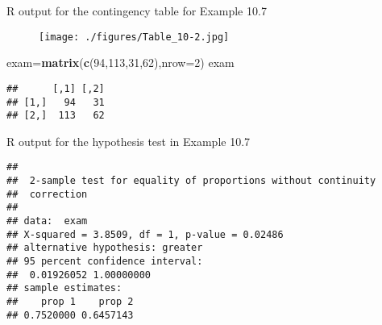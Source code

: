 \documentclass[12pt,ignorenonframetext,aspectratio=169]{beamer}
\newenvironment{Shaded}{\begin{snugshade}}{\end{snugshade}}
\newcommand{\KeywordTok}[1]{\textcolor[rgb]{0.13,0.29,0.53}{\textbf{{#1}}}}
\newcommand{\DataTypeTok}[1]{\textcolor[rgb]{0.13,0.29,0.53}{{#1}}}
\newcommand{\DecValTok}[1]{\textcolor[rgb]{0.00,0.00,0.81}{{#1}}}
\newcommand{\NormalTok}[1]{{#1}}
\begin{document}
\begin{frame}[fragile]{R output for the contingency table for Example
10.7}

\begin{figure}[htbp]
\centering
\texttt{[image: ./figures/Table\_10-2.jpg]}
\caption{}
\end{figure}

\begin{Shaded}
\begin{Highlighting}[]
\NormalTok{exam=}\KeywordTok{matrix}\NormalTok{(}\KeywordTok{c}\NormalTok{(}\DecValTok{94}\NormalTok{,}\DecValTok{113}\NormalTok{,}\DecValTok{31}\NormalTok{,}\DecValTok{62}\NormalTok{),}\DataTypeTok{nrow=}\DecValTok{2}\NormalTok{)}
\NormalTok{exam}
\end{Highlighting}
\end{Shaded}

\begin{verbatim}
##      [,1] [,2]
## [1,]   94   31
## [2,]  113   62
\end{verbatim}


\end{frame}

\begin{frame}[fragile]{R output for the hypothesis test in Example 10.7}

\begin{verbatim}
## 
##  2-sample test for equality of proportions without continuity
##  correction
## 
## data:  exam
## X-squared = 3.8509, df = 1, p-value = 0.02486
## alternative hypothesis: greater
## 95 percent confidence interval:
##  0.01926052 1.00000000
## sample estimates:
##    prop 1    prop 2 
## 0.7520000 0.6457143
\end{verbatim}

\note{}

\end{frame}
\end{document}
